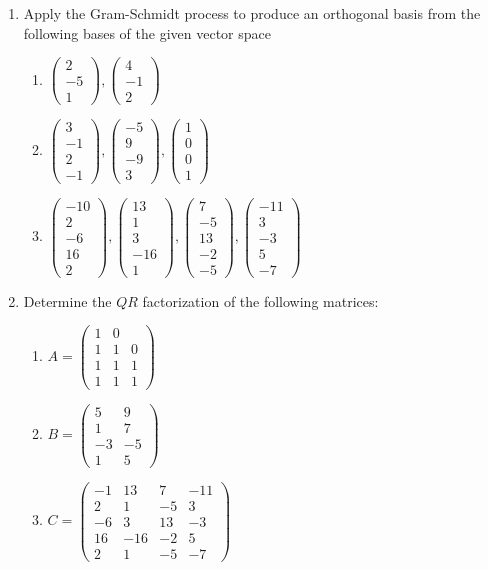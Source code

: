 \documentclass[12pt]{article}
\numberwithin{equation}{subsection}
\numberwithin{figure}{subsection}
\theoremstyle{note}
\newcommand\m[1]{\begin{pmatrix}#1\end{pmatrix}}
\begin{document}
\begin{enumerate}[label=\arabic*.]
\item Apply the Gram-Schmidt process to produce an orthogonal basis from the following bases of the given vector space
\begin{enumerate}
	\item $\m{2 \\ -5 \\1},\m{4 \\ -1 \\2}$
	\item $\m{3 \\ -1 \\ 2 \\ -1}, \m{-5 \\ 9 \\ -9 \\ 3}, \m{ 1\\ 0 \\  0 \\ 1}$
	\item $\m{-10\\2\\-6\\16\\2}, \m{13 \\ 1\\ 3\\-16\\1}, \m{7\\-5\\13\\-2\\-5}, \m{-11\\3\\-3\\5\\-7}$
\end{enumerate}

\item Determine the $QR$ factorization of the following matrices:
\begin{enumerate}
	\item $A=\m{1 & 0 & \\ 1 & 1 & 0 \\ 1 & 1 & 1 \\ 1 & 1 & 1}$
	\item $B=\m{5 & 9 \\ 1 & 7 \\ -3 & -5 \\ 1 & 5}$
	\item $C=\m{-1 & 13 & 7 & -11 \\ 2 & 1 & -5 & 3\\ -6 & 3 & 13 & -3 \\ 16 & -16 & -2 & 5 \\ 2 & 1 & -5 & -7}$
\end{enumerate}


\end{enumerate}
\end{document}
